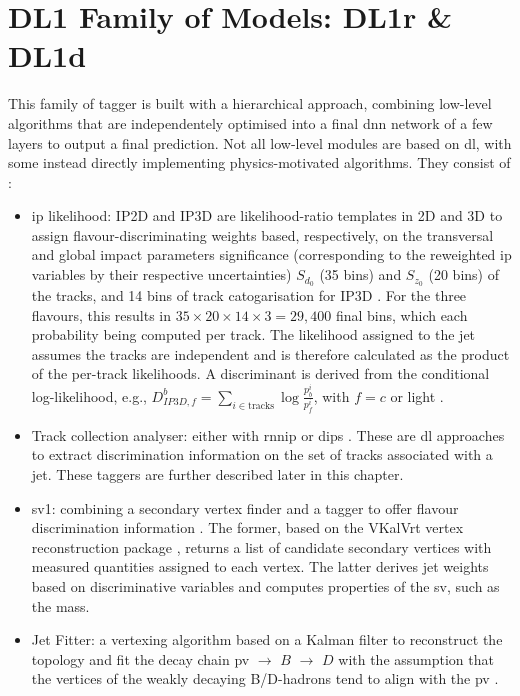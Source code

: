 \section{DL1 Family of Models: DL1r \& DL1d}
This family of tagger is built with a hierarchical approach, combining low-level algorithms that are independentely optimised into a final \gls{dnn} network of a few layers to output a final prediction. Not all low-level modules are based on \gls{dl}, with some instead directly implementing physics-motivated algorithms. They consist of \cite{Paganini:2289214, atlas:FTAGRUN2}:
\begin{itemize}
  \item \gls{ip} likelihood: IP2D and IP3D are likelihood-ratio templates in 2D and 3D to assign flavour-discriminating weights based, respectively, on the transversal and global impact parameters significance (corresponding to the reweighted \gls{ip} variables by their respective uncertainties) $S_{d_0}$ (35 bins) and $S_{z_0}$ (20 bins) of the tracks, and 14 bins of track catogarisation for IP3D \cite{ATLAS:2017bcq}. For the three flavours, this results in $35 \times 20 \times 14 \times 3 = 29,400$ final bins, which each probability being computed per track. The likelihood assigned to the jet assumes the tracks are independent and is therefore calculated as the product of the per-track likelihoods. A discriminant is derived from the conditional log-likelihood, e.g., $D^b_{IP3D,f} = \sum_{i \in \textrm{tracks}} \log\frac{p_b^i}{p_f^i}$, with $f= c$ or light \cite{ATL-PHYS-PUB-2015-022}.
  \item Track collection analyser: either with \gls{rnnip} \cite{ATL-PHYS-PUB-2017-003} or \gls{dips} \cite{ATL-PHYS-PUB-2020-014}. These are \gls{dl} approaches to extract discrimination information on the set of tracks associated with a jet. These taggers are further described later in this chapter.  
  \item \gls{sv1}: combining a secondary vertex finder and a tagger to offer flavour discrimination information \cite{atlas:FTAGRUN2}. The former, based on the VKalVrt vertex reconstruction package \cite{Kostyukhin:685551}, returns a list of candidate secondary vertices with measured quantities assigned to each vertex. The latter derives jet weights based on discriminative variables and computes properties of the \gls{sv}, such as the mass. 
  \item Jet Fitter: a vertexing algorithm based on a Kalman filter to reconstruct the topology and fit the decay chain \gls{pv} $\rightarrow$ $B$ $\rightarrow$ $D$ with the assumption that the vertices of the weakly decaying B/D-hadrons tend to align with the \gls{pv} \cite{atlas:FTAGRUN2, ATL-PHYS-PUB-2018-025}. 
\end{itemize}

